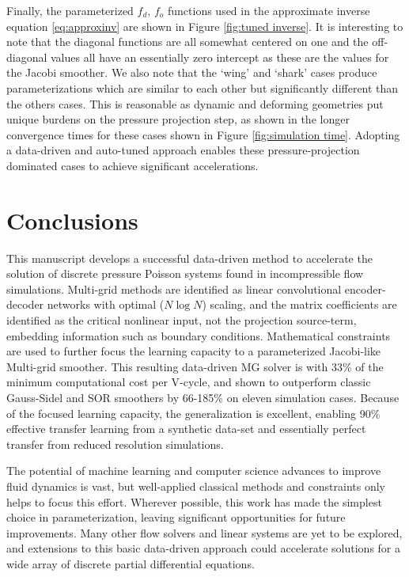 \documentclass[review]{elsarticle}
\begin{document}
Finally, the parameterized $f_d,\,f_o$ functions used in the approximate inverse equation \ref{eq:approxinv} are shown in Figure \ref{fig:tuned inverse}. It is interesting to note that the diagonal functions are all somewhat centered on one and the off-diagonal values all have an essentially zero intercept as these are the values for the Jacobi smoother. We also note that the `wing' and `shark' cases produce parameterizations which are similar to each other but significantly different than the others cases. This is reasonable as dynamic and deforming geometries put unique burdens on the pressure projection step, as shown in the longer convergence times for these cases shown in Figure \ref{fig:simulation time}. Adopting a data-driven and auto-tuned approach enables these pressure-projection dominated cases to achieve significant accelerations.

\section{Conclusions}

This manuscript develops a successful data-driven method to accelerate the solution of discrete pressure Poisson systems found in incompressible flow simulations. Multi-grid methods are identified as linear convolutional encoder-decoder networks with optimal ($N\log N$) scaling, and the matrix coefficients are identified as the critical nonlinear input, not the projection source-term, embedding information such as boundary conditions. Mathematical constraints are used to further focus the learning capacity to a parameterized Jacobi-like Multi-grid smoother. This resulting data-driven MG solver is with 33\% of the minimum computational cost per V-cycle, and shown to outperform classic Gauss-Sidel and SOR smoothers by 66-185\% on eleven simulation cases. Because of the focused learning capacity, the generalization is excellent, enabling 90\% effective transfer learning from a synthetic data-set and essentially perfect transfer from reduced resolution simulations. 

The potential of machine learning and computer science advances to improve fluid dynamics is vast, but well-applied classical methods and constraints only helps to focus this effort. Wherever possible, this work has made the simplest choice in parameterization, leaving significant opportunities for future improvements. Many other flow solvers and linear systems are yet to be explored, and extensions to this basic data-driven approach could accelerate solutions for a wide array of discrete partial differential equations. 



\end{document}

